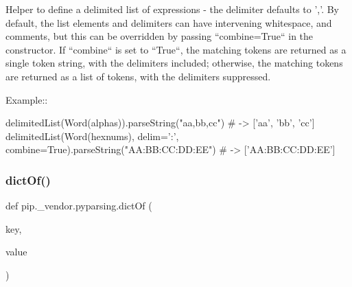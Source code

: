 \begin{DoxyVerb}Helper to define a delimited list of expressions - the delimiter
defaults to ','. By default, the list elements and delimiters can
have intervening whitespace, and comments, but this can be
overridden by passing ``combine=True`` in the constructor. If
``combine`` is set to ``True``, the matching tokens are
returned as a single token string, with the delimiters included;
otherwise, the matching tokens are returned as a list of tokens,
with the delimiters suppressed.

Example::

    delimitedList(Word(alphas)).parseString("aa,bb,cc") # -> ['aa', 'bb', 'cc']
    delimitedList(Word(hexnums), delim=':', combine=True).parseString("AA:BB:CC:DD:EE") # -> ['AA:BB:CC:DD:EE']
\end{DoxyVerb}
 \mbox{\label{namespacepip_1_1__vendor_1_1pyparsing_abd1e06b7d4ce771fea15e9f5269438c2}} 
\subsubsection{\texorpdfstring{dict\+Of()}{dictOf()}}
{\footnotesize\ttfamily def pip.\+\_\+vendor.\+pyparsing.\+dict\+Of (\begin{DoxyParamCaption}\item[{}]{key,  }\item[{}]{value }\end{DoxyParamCaption})}

